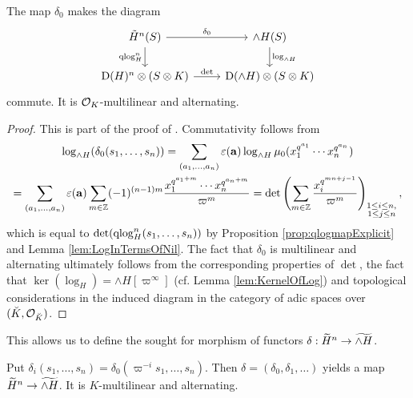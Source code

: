 \documentclass[../main.tex]{subfiles}
\begin{document}
\begin{prop}
  The map $\delta_0$ makes the diagram 
  \begin{equation*}
    \begin{tikzcd}[ampersand replacement=\&]
    	{\tilde H^n(S)} \& {\wedge H(S)} \\
    	{\Dio(H)^n \otimes (S \otimes K)} \& {\Dio(\wedge H) \otimes(S \otimes K)}
    	\arrow["{\delta_0}", from=1-1, to=1-2]
    	\arrow["{\qlog_H^n}"', from=1-1, to=2-1]
    	\arrow["{\log_{\wedge H}}", from=1-2, to=2-2]
    	\arrow["\det", from=2-1, to=2-2]
    \end{tikzcd}
  \end{equation*}
  commute. It is $\cO_K$-multilinear and alternating.
\begin{proof}
  This is part of the proof of \cite[Theorem
  2.10.3]{BoyarchenkoWeinstein2011MaxVar}.
  Commutativity follows from 
  \begin{multline*}
    \log_{\wedge H}(\delta_0(s_1, \dots, s_n)) = \sum_{(a_1, \dots, a_n)} 
    \varepsilon(\mathbf a) \log_{\wedge H} \mu_0( x_1^{q^{a_1}}\cdots x_n^{q^{a_n}})
     \\ = \sum_{(a_1, \dots, a_n)} \varepsilon(\mathbf a) \sum_{m \in \Z} (-1)^{(n-1)m}
    \frac{x_1^{q^{a_1+m}} \cdots x_n^{q^{a_n+m}}}{\varpi^m} 
    = \det \left( \sum_{m \in \Z} \frac{x_i^{q^{mn + j-1}}}{\varpi^m} \right)_{\substack{
      1 \leq i \leq n,\\
      1 \leq j \leq n}},
  \end{multline*}
  which is equal to $\det(\qlog_H^n(s_1, \dots, s_n))$ by Proposition 
  \ref{prop:qlogmapExplicit} and Lemma \ref{lem:LogInTermsOfNil}. 
  The fact that $\delta_0$ is multilinear and alternating ultimately follows
  from the corresponding properties of $\det$, the fact that $\ker(\log_H) =
  \wedge H[\varpi^\infty]$ (cf. Lemma \ref{lem:KernelOfLog}) and topological considerations
  in the induced diagram in the category of adic spaces over $(\breve K, \cO_{\breve K})$.
\end{proof}
\end{prop}

This allows us to define the sought for morphism of functors
$\delta: \Tilde H^n \to \Tilde {\wedge H}$. 
\begin{defi}\label{def:DeltaMap}
  Put $\delta_i(s_1, \dots, s_n) = \delta_0(\varpi^{-i} s_1, \dots, s_n)$. Then 
  $\delta = (\delta_0, \delta_1, \dots)$ yields a map 
  $\Tilde H^n \to \Tilde{\wedge H}$. It is $K$-multilinear and alternating.
\end{defi}
\end{document}

